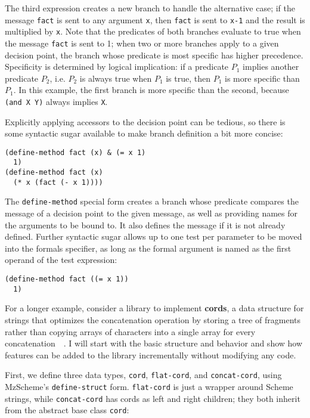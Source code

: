 \documentclass{article}
\newcommand{\defn}[1]{\textbf{#1}}
\newcommand{\code}[1]{\texttt{#1}}
\begin{document}
The third expression creates a new branch to handle the alternative
case; if the message \code{fact} is sent to any argument \code{x},
then \code{fact} is sent to \code{x-1} and the result is multiplied by
\code{x}.  Note that the predicates of both branches evaluate to true
when the message \code{fact} is sent to 1; when two or more branches
apply to a given decision point, the branch whose predicate is most
specific has higher precedence.  Specificity is determined by logical
implication: if a predicate $P_1$ implies another predicate $P_2$,
i.e. $P_2$ is always true when $P_1$ is true, then $P_1$ is more
specific than $P_1$.  In this example, the first branch is more
specific than the second, because \code{(and X Y)} always implies
\code{X}.

Explicitly applying accessors to the decision point can be tedious,
so there is some syntactic sugar available to make branch definition a 
bit more concise:

\begin{verbatim}
(define-method fact (x) & (= x 1)
  1)
(define-method fact (x)
  (* x (fact (- x 1))))
\end{verbatim}

The \code{define-method} special form creates a branch whose predicate
compares the message of a decision point to the given message, as well
as providing names for the arguments to be bound to.  It also defines
the message if it is not already defined.  Further syntactic sugar
allows up to one test per parameter to be moved into the formals
specifier, as long as the formal argument is named as the first
operand of the test expression:

\begin{verbatim}
(define-method fact ((= x 1))
  1)
\end{verbatim}

For a longer example, consider a library to implement \defn{cords}, a
data structure for strings that optimizes the concatenation operation
by storing a tree of fragments rather than copying arrays of
characters into a single array for every
concatenation~\cite{cords}~\cite{cords-in-AspectJ}.  I will start with
the basic structure and behavior and show how features can be added to
the library incrementally without modifying any code.

First, we define three data types, \code{cord}, \code{flat-cord}, 
and \code{concat-cord}, using MzScheme's \code{define-struct} form.  
\code{flat-cord} is just a wrapper around Scheme strings, while
\code{concat-cord} has cords as left and right children; they both
inherit from the abstract base class \code{cord}:
\end{document}
